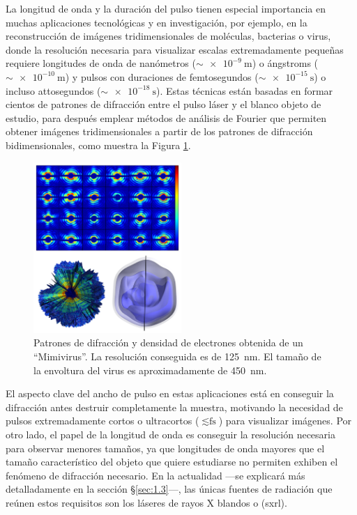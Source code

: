 La longitud de onda y la duración del pulso tienen especial importancia en muchas aplicaciones tecnológicas y en investigación, por ejemplo, en la reconstrucción de imágenes tridimensionales de moléculas\autocite{vonardenneStructureDeterminationSingle2018}, bacterias o virus\autocite{ekebergThreeDimensionalReconstructionGiant2015}, donde la resolución necesaria para visualizar escalas extremadamente pequeñas requiere longitudes de onda de nanómetros ($\sim\qty{e-9}{\m}$) o ángstroms ($\sim\qty{e-10}{\m}$) y pulsos con duraciones de femtosegundos ($\sim\qty{e-15}{\s}$) o incluso attosegundos ($\sim\qty{e-18}{\s}$). Estas técnicas están basadas en formar cientos de patrones de difracción entre el pulso láser y el blanco objeto de estudio, para después emplear métodos de análisis de Fourier que permiten obtener imágenes tridimensionales a partir de los patrones de difracción bidimensionales, como muestra la Figura \ref{fig:ch1_pulso}.

\begin{figure}[ht!]
    \centering
    \includegraphics[width=0.5\textwidth]{Figuras/ch1_pulso.png}
    \caption{Patrones de difracción y densidad de electrones obtenida de un \enquote{Mimivirus}\autocite{ekebergThreeDimensionalReconstructionGiant2015}. La resolución conseguida es de \qty{125}{\nm}. El tamaño de la envoltura del virus es aproximadamente de \qty{450}{\nm}.}
    \label{fig:ch1_pulso}
\end{figure}

El aspecto clave del ancho de pulso en estas aplicaciones está en conseguir la difracción antes destruir completamente la muestra\autocite{neutzePotentialBiomolecularImaging2000}, motivando la necesidad de pulsos extremadamente cortos o ultracortos ($\lesssim\unit{\fs}$) para visualizar imágenes. Por otro lado, el papel de la longitud de onda es conseguir la resolución necesaria para observar menores tamaños, ya que longitudes de onda mayores que el tamaño característico del objeto que quiere estudiarse no permiten exhiben el fenómeno de difracción necesario. En la actualidad ---se explicará más detalladamente en la sección \S\ref{sec:1.3}---, las únicas fuentes de radiación que reúnen estos requisitos son los láseres de rayos X blandos o \emph{} (\acrshort{sxrl}).

